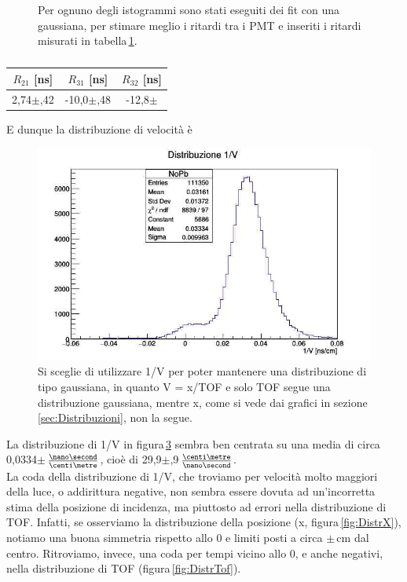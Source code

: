 \documentclass[a4paper,twocolumn]{article}
\begin{document}
\begin{figure}[H]
\begin{center}
\begin{subfigure}[b]{0.45\textwidth}
\caption{}
\label{fig:Dt32Fore}
\end{subfigure}
\end{center}
\caption{Per ognuno degli istogrammi sono stati eseguiti dei fit con una gaussiana, per stimare meglio i ritardi tra i PMT e inseriti i ritardi misurati in tabella\,\ref{tab:RitFore}.}
\label{fig:RitFore}
\end{figure}


\begin{table}[H]
\begin{tabular}{|c|c|c|}
\hline
$R_{21}$ [ns] & $R_{31}$ [ns] & $R_{32}$ [ns] \\
\hline
2,74\:$\pm$\:1,42 & -10,0\:$\pm$\:1,48 & -12,8\:$\pm$\:1.65\\
\hline
\end{tabular}
\caption{}
\label{tab:RitFore}
\end{table}

E dunque la distribuzione di velocità è

\begin{figure}[H]
\centering
\includegraphics[scale=0.4]{./immagini/TimeOfFlight/Distr1SuV.jpg}
\caption{Si sceglie di utilizzare 1/V per poter mantenere una distribuzione di tipo gaussiana, in quanto V = x/TOF e solo TOF segue una distribuzione gaussiana, mentre x, come si vede dai grafici in sezione\,\ref{sec:Distribuzioni}, non la segue.}
\label{fig:Distr1SuVFore}
\end{figure}

La distribuzione di 1/V in figura\,\ref{fig:Distr1SuVFore} sembra ben centrata su una media di circa 0,0334\:$\pm$\,$\frac{\nano\second}{\centi\metre}$, cioè di 29,9\:$\pm$,9\,$\frac{\centi\metre}{\nano\second}$.\\
La coda della distribuzione di 1/V, che troviamo per velocità molto maggiori della luce, o addirittura negative, non sembra essere dovuta ad un'incorretta stima della posizione di incidenza, ma piuttosto ad errori nella distribuzione di TOF. Infatti, se osserviamo la distribuzione della posizione (x, figura\,\ref{fig:DistrX}), notiamo una buona simmetria rispetto allo 0 e limiti posti a circa $\pm$\,cm dal centro. Ritroviamo, invece, una coda per tempi vicino allo 0, e anche negativi, nella distribuzione di TOF (figura\,\ref{fig:DistrTof}).
\end{document}
